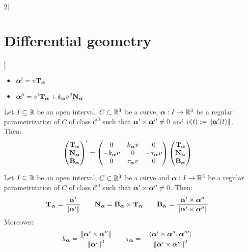 \documentclass[../../../main_math.tex]{subfiles}
\begin{document}
\begin{multicols}{2}[\section{Differential geometry}]
\begin{lemma}
    \begin{itemize}
      \item $\vf{\alpha}'=v\T\alpha$
      \item $\vf{\alpha}''=v'\T\alpha+k_{\vf\alpha} v^2\N\alpha$
    \end{itemize}
  \end{lemma}
  \begin{theorem}
    Let $I\subseteq\RR$ be an open interval, $C\subset\RR^3$ be a curve, $\vf{\alpha}:I\rightarrow\RR^3$ be a regular parametrization of $C$ of class $\mathcal{C}^3$ such that $\vf{\alpha}'\times \vf{\alpha}''\ne 0$ and $v(t):=\|\vf{\alpha}'(t)\|$. Then:
    $$
      \begin{pmatrix}
        \T\alpha \\
        \N\alpha \\
        \B\alpha \\
      \end{pmatrix}'=
      \begin{pmatrix}
        0                & k_{\vf\alpha} v & 0            \\
        -k_{\vf\alpha} v & 0               & -\ta\alpha v \\
        0                & \ta\alpha v     & 0
      \end{pmatrix}
      \begin{pmatrix}
        \T\alpha \\
        \N\alpha \\
        \B\alpha \\
      \end{pmatrix}
    $$
  \end{theorem}
  \begin{corollary}
    Let $I\subseteq\RR$ be an open interval, $C\subset\RR^3$ be a curve and $\vf{\alpha}:I\rightarrow\RR^3$ be a regular parametrization of $C$ of class $\mathcal{C}^3$ such that $\vf{\alpha}'\times \vf{\alpha}''\ne 0$. Then:
    $$\T\alpha=\frac{\vf{\alpha}'}{\|\vf{\alpha}'\|}\qquad\N\alpha=\B\alpha\times\T\alpha\qquad\B\alpha=\frac{\vf{\alpha}'\times\vf{\alpha}''}{\|\vf{\alpha}'\times\vf{\alpha}''\|}$$
    Moreover: $$k_{\vf\alpha}=\frac{\|\vf{\alpha}'\times\vf{\alpha}''\|}{{\|\vf{\alpha}'\|}^3}\qquad\ta\alpha=-\frac{\langle\vf{\alpha}'\times\vf{\alpha}'',\vf{\alpha}'''\rangle}{{\|\vf{\alpha}'\times\vf{\alpha}''\|}^2}$$
  \end{corollary}

\end{multicols}
\end{document}

